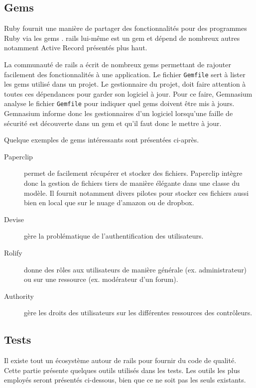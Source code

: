 \subsection{Gems}
\label{gems}
Ruby fournit une manière de partager des fonctionnalités pour des programmes Ruby via les \glspl{gem} \cite{gem}. \gls{rails} lui-même est un \gls{gem} et dépend de nombreux autres notamment Active Record présentés plus haut.

\label{gemnasium}
La communauté de \gls{rails} a écrit de nombreux \glspl{gem}  permettant de rajouter facilement des fonctionnalités à une application. Le fichier \texttt{Gemfile} sert à lister les \glspl{gem}  utilisé dans un projet. Le gestionnaire du projet, doit faire attention à toutes ces dépendances pour garder son logiciel à jour. Pour ce faire, Gemnasium analyse le fichier \texttt{Gemfile} pour indiquer quel \glspl{gem}  doivent être mis à jours. Gemnasium informe donc les gestionnaires d'un logiciel lorsqu'une faille de sécurité est découverte dans un \gls{gem} et qu'il faut donc le mettre à jour.

Quelque exemples de \glspl{gem} intéressants sont présentées ci-après.
\begin{description}
  \item[Paperclip \cite{paperclip}] permet de facilement récupérer et stocker des fichiers. Paperclip intègre donc la gestion de fichiers tiers de manière élégante dans une classe du modèle. Il fournit notamment divers pilotes pour stocker ces fichiers aussi bien en local que sur le nuage d'amazon ou de dropbox.
  \item[Devise \cite{devise}] gère la problématique de l'authentification des utilisateurs.
  \item[Rolify \cite{rolify}] donne des rôles aux utilisateurs de manière générale (ex. administrateur) ou sur une ressource (ex. modérateur d'un forum).\label{rolify}
  \item[Authority \cite{authority}] gère les droits des utilisateurs sur les différentes ressources des contrôleurs. \label{authority}
\end{description}

\subsection{Tests}
\label{rails-tests}
Il existe tout un écosystème autour de \gls{rails} pour fournir du code de qualité. Cette partie présente quelques outils utilisés dans les tests. Les outils les plus employés seront présentés ci-dessous, bien que ce ne soit pas les seuls existants.

